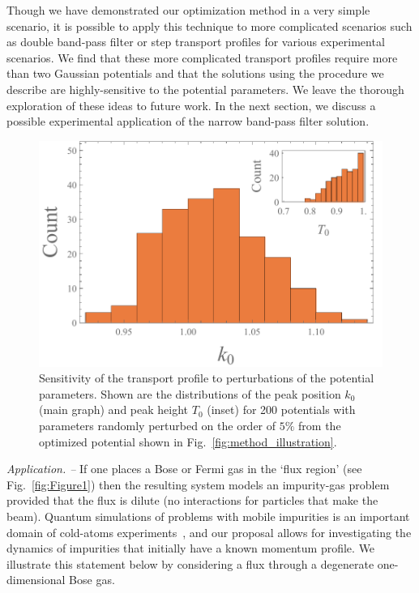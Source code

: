 \documentclass[twocolumn,amsmath,amssymb,showpacs,prl,superscriptaddress,aps]{revtex4-1}
\begin{document}
Though we have demonstrated our optimization method in a very simple scenario, it is possible to apply this technique to more complicated scenarios such as double band-pass filter or step transport profiles for various experimental scenarios. We find that these more complicated transport profiles require more than two Gaussian potentials and that the solutions using the procedure we describe are highly-sensitive to the potential parameters. We leave the thorough exploration of these ideas to future work. In the next section, we discuss a possible experimental application of the narrow band-pass filter solution. 


\begin{figure}
   \includegraphics[width=1\linewidth]{figures/plot_sensitivity.pdf}
 \caption[Sensitivity Plot]{Sensitivity of the transport profile to perturbations of the potential parameters. Shown are the distributions of the peak position $k_0$ (main graph) and peak height $T_0$ (inset) for 200 potentials with parameters randomly perturbed on the order of $5\%$ from the optimized potential shown in Fig.~\ref{fig:method_illustration}. }
 \label{fig:sensitivity}
\end{figure}



{\it Application. --} If one places a Bose or Fermi gas in the `flux region' (see Fig.~\ref{fig:Figure1}) then the resulting 
system models an impurity-gas problem provided that the flux is dilute (no interactions for particles that make the beam).
Quantum simulations of problems with mobile impurities is an important domain of cold-atoms 
experiments~\cite{zwierlein2009,salomon2009,grimm2012, widera2012, catani2012, fukuhara2013, hu2016,arlt2016,zaccanti2017},
and our proposal allows for investigating the dynamics of impurities that initially have 
a known momentum profile. We illustrate this statement below by considering a flux through a degenerate 
one-dimensional Bose gas. 
\end{document}
